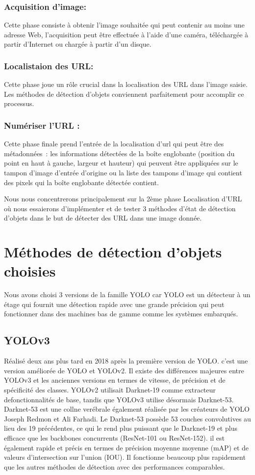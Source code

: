      \subsubsection{Acquisition d'image:} Cette phase consiste à obtenir l'image souhaitée qui peut contenir au moins une adresse Web, l'acquisition peut être effectuée à l'aide d'une 	caméra, téléchargée à partir d'Internet ou chargée à partir d'un disque.
     \subsubsection{Localistaion des URL:} Cette phase joue un rôle crucial dans la localisation des URL dans l'image saisie. Les méthodes de détection d'objets conviennent parfaitement pour accomplir ce processus.
     \subsubsection{Numériser l'URL :} Cette phase finale prend l'entrée de la localisation d'url qui peut être des métadonnées : les informations détectées de la boîte englobante (position du point en haut à gauche, largeur et hauteur) qui peuvent être appliquées sur le tampon 	d'image d'entrée d'origine ou la liste des tampons d'image qui contient des pixels qui la boîte englobante détectée contient.

     Nous nous concentrerons principalement sur la 2ème phase Localisation d'URL où nous essaierons d'implémenter et de tester 3 méthodes d'état de détection d'objets dans le but de détecter des URL dans une image donnée.

\section{Méthodes de détection d'objets choisies}
          Nous avons choisi 3 versions de la famille YOLO car YOLO est un détecteur à un étage qui fournit une détection rapide avec une grande précision qui peut fonctionner dans des machines bas de gamme comme les systèmes embarqués.
          \subsection{YOLOv3} Réalisé deux ans plus tard en 2018 après la première version de YOLO. c'est une version améliorée de YOLO et YOLOv2. Il existe des différences 	majeures entre YOLOv3 et les anciennes versions en termes de vitesse, de précision et de spécificité des classes. YOLOv2 utilisait Darknet-19 comme extracteur defonctionnalités de base, tandis que YOLOv3 utilise désormais Darknet-53. Darknet-53 	est une collne verébrale également réalisée par les créateurs de YOLO Joseph Redmon et Ali Farhadi. Le Darknet-53 possède 53 couches convolutives au lieu des 19 	précédentes, ce qui le rend plus puissant que le Darknet-19 et plus efficace que les backbones concurrents (ResNet-101 ou ResNet-152). il est également rapide et précis en termes de précision moyenne moyenne (mAP) et de valeurs d'intersection sur l'union (IOU). Il fonctionne beaucoup plus rapidement que les autres méthodes de détection avec des performances comparables.
